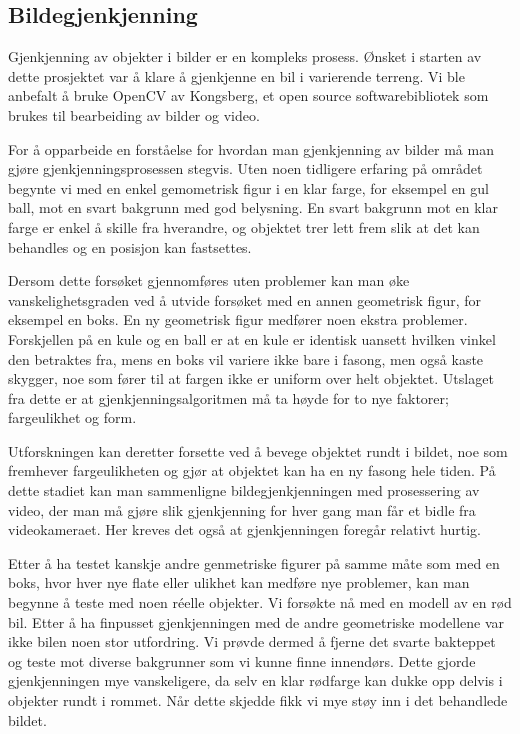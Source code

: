 \subsection{Bildegjenkjenning}

Gjenkjenning av objekter i bilder er en kompleks prosess. Ønsket i starten av dette prosjektet var å klare å gjenkjenne en bil i varierende terreng. Vi ble anbefalt å bruke OpenCV av Kongsberg, et open source softwarebibliotek som brukes til bearbeiding av bilder og video. 

For å opparbeide en forståelse for hvordan man gjenkjenning av bilder må man gjøre gjenkjenningsprosessen stegvis. Uten noen tidligere erfaring på området begynte vi med en enkel gemometrisk figur i en klar farge, for eksempel en gul ball, mot en svart bakgrunn med god belysning. En svart bakgrunn mot en klar farge er enkel å skille fra hverandre, og objektet trer lett frem slik at det kan behandles og en posisjon kan fastsettes. 

Dersom dette forsøket gjennomføres uten problemer kan man øke vanskelighetsgraden ved å utvide forsøket med en annen geometrisk figur, for eksempel en boks. En ny geometrisk figur medfører noen ekstra problemer. Forskjellen på en kule og en ball er at en kule er identisk uansett hvilken vinkel den betraktes fra, mens en boks vil variere ikke bare i fasong, men også kaste skygger, noe som fører til at fargen ikke er uniform over helt objektet. Utslaget fra dette er at gjenkjenningsalgoritmen må ta høyde for to nye faktorer; fargeulikhet og form.

Utforskningen kan deretter forsette ved å bevege objektet rundt i bildet, noe som fremhever fargeulikheten og gjør at objektet kan ha en ny fasong hele tiden. På dette stadiet kan man sammenligne bildegjenkjenningen med prosessering av video, der man må gjøre slik gjenkjenning for hver gang man får et bidle fra videokameraet. Her kreves det også at gjenkjenningen foregår relativt hurtig. 

Etter å ha testet kanskje andre genmetriske figurer på samme måte som med en boks, hvor hver nye flate eller ulikhet kan medføre nye problemer, kan man begynne å teste med noen réelle objekter. Vi forsøkte nå med en modell av en rød bil. Etter å ha finpusset gjenkjenningen med de andre geometriske modellene var ikke bilen noen stor utfordring. Vi prøvde dermed å fjerne det svarte bakteppet og teste mot diverse bakgrunner som vi kunne finne innendørs. Dette gjorde gjenkjenningen mye vanskeligere, da selv en klar rødfarge kan dukke opp delvis i objekter rundt i rommet. Når dette skjedde fikk vi mye støy inn i det behandlede bildet.

